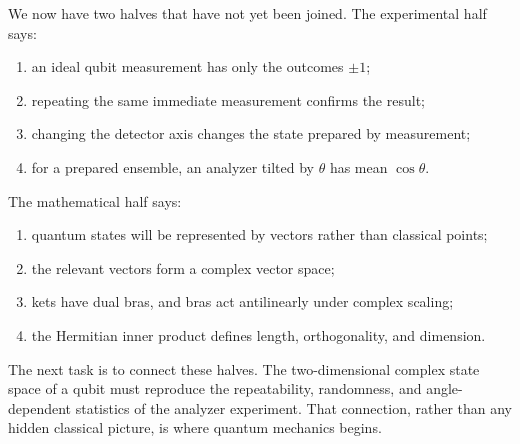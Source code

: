 We now have two halves that have not yet been joined. The experimental half says:
\begin{enumerate}
  \item an ideal qubit measurement has only the outcomes \(\pm1\);
  \item repeating the same immediate measurement confirms the result;
  \item changing the detector axis changes the state prepared by measurement;
  \item for a prepared ensemble, an analyzer tilted by \(\theta\) has mean \(\cos\theta\).
\end{enumerate}
The mathematical half says:
\begin{enumerate}
  \item quantum states will be represented by vectors rather than classical points;
  \item the relevant vectors form a complex vector space;
  \item kets have dual bras, and bras act antilinearly under complex scaling;
  \item the Hermitian inner product defines length, orthogonality, and dimension.
\end{enumerate}

The next task is to connect these halves. The two-dimensional complex state space of a qubit must reproduce the repeatability, randomness, and angle-dependent statistics of the analyzer experiment. That connection, rather than any hidden classical picture, is where quantum mechanics begins.
